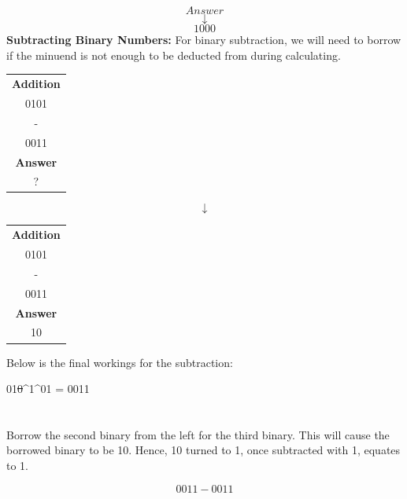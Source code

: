 \documentclass{article}
\begin{document}
\section*{}
$$Answer$$
$$\downarrow$$
$$1000$$
\newpage
\textbf{Subtracting Binary Numbers:}
\newline
\newline
For binary subtraction, we will need to borrow if the minuend is not enough to be deducted from during calculating.
\newline
\begin{table}[h!]
    \centering
    \begin{tabular}{|c|}
    \hline
        \textbf{Addition} \\
        0101  \\
        -  \\
        0011   \\
        \hline
               \textbf{Answer} \\
        ?  \\ 
        \hline
    \end{tabular}
    \label{tab:my_label}
\end{table}
$$\downarrow$$
\begin{table}[h!]
    \centering
    \begin{tabular}{|c|}
    \hline
        \textbf{Addition} \\
        0101  \\
        -  \\
        0011   \\
        \hline
               \textbf{Answer} \\
        10  \\ 
        \hline
    \end{tabular}
    \label{tab:my_label}
\end{table}
\newline
\newline
Below is the final workings for the subtraction:
\newline
\newline
\centerline{01\st{0}^1^01 = 0011}
\section*{}
Borrow the second binary from the left for the third binary. This will cause the borrowed binary to be 10. Hence, 10 turned to 1, once subtracted with 1, equates to 1.

$$0011-0011$$
\end{document}
